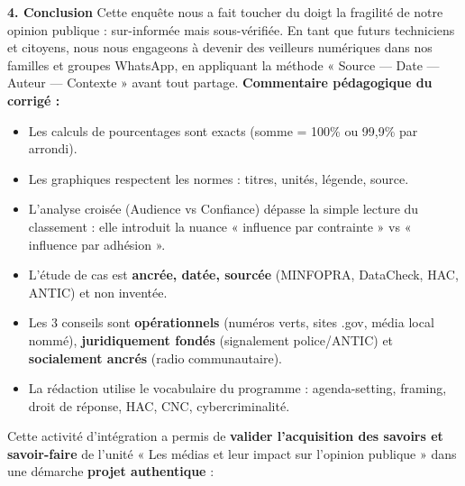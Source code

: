 \documentclass[11pt]{article}
\newcommand{\cle}[1]{{\popxbold\color{popdark}#1}}
\newcounter{popsec}
\newcounter{popsub}
\newcommand{\courssub}[1]{%
  \stepcounter{popsub}%
  \par\vspace{9pt}\noindent{\popxbold\fontsize{11.5}{13}\selectfont\color{popink}{\color{poporange}\thepopsec.\thepopsub}\hspace{6pt}#1}\par\nopagebreak\vspace{4pt}
}
\begin{document}
\begin{exoresolu}
\textbf{4. Conclusion}
Cette enquête nous a fait toucher du doigt la fragilité de notre opinion publique : sur-informée mais sous-vérifiée. En tant que futurs techniciens et citoyens, nous nous engageons à devenir des \cle{veilleurs numériques} dans nos familles et groupes WhatsApp, en appliquant la méthode « Source — Date — Auteur — Contexte » avant tout partage.
\tcblower
\textbf{Commentaire pédagogique du corrigé :}
\begin{itemize}
    \item Les calculs de pourcentages sont exacts (somme = 100\% ou 99,9\% par arrondi).
    \item Les graphiques respectent les normes : titres, unités, légende, source.
    \item L'analyse croisée (Audience vs Confiance) dépasse la simple lecture du classement : elle introduit la nuance « influence par contrainte » vs « influence par adhésion ».
    \item L'étude de cas est \textbf{ancrée, datée, sourcée} (MINFOPRA, DataCheck, HAC, ANTIC) et non inventée.
    \item Les 3 conseils sont \textbf{opérationnels} (numéros verts, sites .gov, média local nommé), \textbf{juridiquement fondés} (signalement police/ANTIC) et \textbf{socialement ancrés} (radio communautaire).
    \item La rédaction utilise le vocabulaire du programme : \cle{agenda-setting}, \cle{framing}, \cle{droit de réponse}, \cle{HAC}, \cle{CNC}, \cle{cybercriminalité}.
\end{itemize}
\end{exoresolu}

\courssub{Bilan de l'activité}
Cette activité d'intégration a permis de \textbf{valider l'acquisition des savoirs et savoir-faire} de l'unité « Les médias et leur impact sur l'opinion publique » dans une démarche \textbf{projet authentique} :
\end{document}

